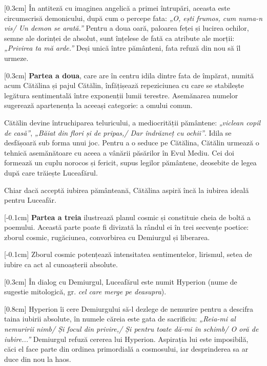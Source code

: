 \documentclass[
12pt,                        %
a4paper                      %
]{article}
\begin{document}
[0.3cm]
În antiteză cu imaginea angelică a primei întrupări, aceasta este circumscrisă demonicului, după cum o percepe fata: \textit{„O, ești frumos, cum numa-n vis/ Un demon se arată.”} Pentru a doua oară, paloarea feței și lucirea ochilor, semne ale dorinței de absolut, sunt înțelese de fată ca atribute ale morții: \textit{„Privirea ta mă arde.”} Deși unică între pământeni, fata refuză din nou să îl urmeze.

[0.3cm]
\textbf{Partea a doua}, care are în centru idila dintre fata de împărat, numită acum Cătălina și pajul Cătălin, înfățișează repeziciunea cu care se stabilește legătura sentimentală între exponenții lumii terestre. Asemănarea numelor sugerează apartenența la aceeași categorie: a omului comun.

Cătălin devine întruchiparea teluricului, a mediocrității pământene: \textit{„viclean copil de casă”}, \textit{„Băiat din flori și de pripas,/ Dar îndrăzneț cu ochii”}. Idila se desfășoară sub forma unui joc. Pentru a o seduce pe Cătălina, Cătălin urmează o tehnică asemănătoare cu aceea a vânării păsărilor în Evul Mediu. Cei doi formează un cuplu norocos și fericit, supus legilor pământene, deosebite de legea după care trăiește Luceafărul.

Chiar dacă acceptă iubirea pământeană, Cătălina aspiră încă la iubirea ideală pentru Luceafăr.

[-0.1cm]
\textbf{Partea a treia} ilustrează planul cosmic și constituie cheia de boltă a poemului. Această parte poate fi divizată la rândul ei în trei secvențe poetice: zborul cosmic, rugăciunea, convorbirea cu Demiurgul și liberarea.

[-0.1cm]
Zborul cosmic potențează intensitatea sentimentelor, lirismul, setea de iubire ca act al cunoașterii absolute.

[0.3cm]
În dialog cu Demiurgul, Luceafărul este numit Hyperion (nume de sugestie mitologică, gr. \textit{cel care merge pe deasupra}).

[0.8cm]
Hyperion îi cere Demiurgului să-l dezlege de nemurire pentru a descifra taina iubirii absolute, în numele căreia este gata de sacrificiu: \textit{„Reia-mi al nemuririi nimb/ Și focul din privire,/ Și pentru toate dă-mi în schimb/ O oră de iubire...”} Demiurgul refuză cererea lui Hyperion. Aspirația lui este imposibilă, căci el face parte din ordinea primordială a cosmosului, iar desprinderea sa ar duce din nou la haos.
\end{document}
